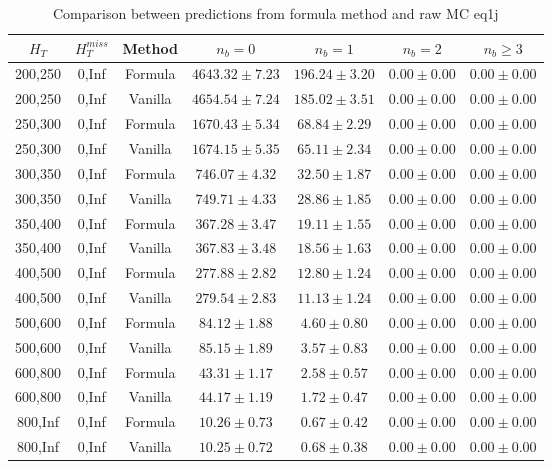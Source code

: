 
\begin{longtable}{ | c | c | c | c | c | c | c | }
\caption{Comparison between predictions from formula method and raw MC eq1j} \label{tab:eq1j} \\    \hline 
$H_{T}$ & $H_{T}^{miss}$ & Method & $n_{b} = 0$ & $n_{b} = 1$ & $n_{b} = 2$ & $n_{b} \ge 3$ \\ \hline200,250 & 0,Inf & Formula  & $  4643.32 \pm  7.23 $ & $   196.24 \pm  3.20 $ & $     0.00 \pm  0.00 $ & $     0.00 \pm  0.00 $  \\  
200,250 & 0,Inf & Vanilla  & $  4654.54 \pm  7.24 $ & $   185.02 \pm  3.51 $ & $     0.00 \pm  0.00 $ & $     0.00 \pm  0.00 $  \\ \hline 
250,300 & 0,Inf & Formula  & $  1670.43 \pm  5.34 $ & $    68.84 \pm  2.29 $ & $     0.00 \pm  0.00 $ & $     0.00 \pm  0.00 $  \\  
250,300 & 0,Inf & Vanilla  & $  1674.15 \pm  5.35 $ & $    65.11 \pm  2.34 $ & $     0.00 \pm  0.00 $ & $     0.00 \pm  0.00 $  \\ \hline 
300,350 & 0,Inf & Formula  & $   746.07 \pm  4.32 $ & $    32.50 \pm  1.87 $ & $     0.00 \pm  0.00 $ & $     0.00 \pm  0.00 $  \\  
300,350 & 0,Inf & Vanilla  & $   749.71 \pm  4.33 $ & $    28.86 \pm  1.85 $ & $     0.00 \pm  0.00 $ & $     0.00 \pm  0.00 $  \\ \hline 
350,400 & 0,Inf & Formula  & $   367.28 \pm  3.47 $ & $    19.11 \pm  1.55 $ & $     0.00 \pm  0.00 $ & $     0.00 \pm  0.00 $  \\  
350,400 & 0,Inf & Vanilla  & $   367.83 \pm  3.48 $ & $    18.56 \pm  1.63 $ & $     0.00 \pm  0.00 $ & $     0.00 \pm  0.00 $  \\ \hline 
400,500 & 0,Inf & Formula  & $   277.88 \pm  2.82 $ & $    12.80 \pm  1.24 $ & $     0.00 \pm  0.00 $ & $     0.00 \pm  0.00 $  \\  
400,500 & 0,Inf & Vanilla  & $   279.54 \pm  2.83 $ & $    11.13 \pm  1.24 $ & $     0.00 \pm  0.00 $ & $     0.00 \pm  0.00 $  \\ \hline 
500,600 & 0,Inf & Formula  & $    84.12 \pm  1.88 $ & $     4.60 \pm  0.80 $ & $     0.00 \pm  0.00 $ & $     0.00 \pm  0.00 $  \\  
500,600 & 0,Inf & Vanilla  & $    85.15 \pm  1.89 $ & $     3.57 \pm  0.83 $ & $     0.00 \pm  0.00 $ & $     0.00 \pm  0.00 $  \\ \hline 
600,800 & 0,Inf & Formula  & $    43.31 \pm  1.17 $ & $     2.58 \pm  0.57 $ & $     0.00 \pm  0.00 $ & $     0.00 \pm  0.00 $  \\  
600,800 & 0,Inf & Vanilla  & $    44.17 \pm  1.19 $ & $     1.72 \pm  0.47 $ & $     0.00 \pm  0.00 $ & $     0.00 \pm  0.00 $  \\ \hline 
800,Inf & 0,Inf & Formula  & $    10.26 \pm  0.73 $ & $     0.67 \pm  0.42 $ & $     0.00 \pm  0.00 $ & $     0.00 \pm  0.00 $  \\  
800,Inf & 0,Inf & Vanilla  & $    10.25 \pm  0.72 $ & $     0.68 \pm  0.38 $ & $     0.00 \pm  0.00 $ & $     0.00 \pm  0.00 $  \\ \hline 
    \hline 
    \hline 
\end{longtable}
